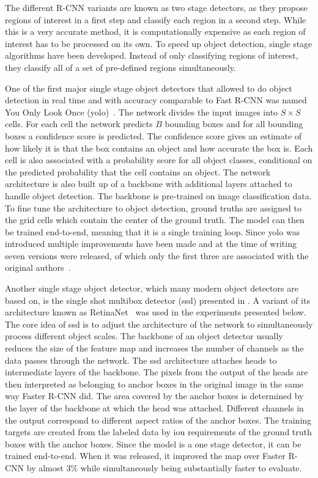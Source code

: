 The different R-CNN variants are known as two stage detectors, as they propose regions of interest in a first step and classify each region in a second step. While this is a very accurate method, it is computationally expensive as each region of interest has to be processed on its own. To speed up object detection, single stage algorithms have been developed. Instead of only classifying regions of interest, they classify all of a set of pre-defined regions simultaneously.

One of the first major single stage object detectors that allowed to do object detection in real time and with accuracy comparable to Fast R-CNN was named You Only Look Once (\acrshort{yolo})~\cite{Redmon:2015aaa}. The network divides the input images into $S\times S$ cells. For each cell the network predicts $B$ bounding boxes and for all bounding boxes a confidence score is predicted. The confidence score gives an estimate of how likely it is that the box contains an object and how accurate the box is. Each cell is also associated with a probability score for all object classes, conditional on the predicted probability that the cell contains an object. The network architecture is also built up of a backbone with additional layers attached to handle object detection. The backbone is pre-trained on image classification data. To fine tune the architecture to object detection, ground truths are assigned to the grid cells which contain the center of the ground truth. The model can then be trained end-to-end, meaning that it is a single training loop. Since \acrshort{yolo} was introduced multiple improvements have been made and at the time of writing seven versions were released, of which only the first three are associated with the original authors~\cite{Redmon:2016aaa, Redmon:2018aaa, Bochkovskiy:2020aaa, Jocher:2022aaa, Li:2022aaa, Wang:2022aaa}.

Another single stage object detector, which many modern object detectors are based on, is the single shot multibox detector (\acrshort{ssd}) presented in \cite{Liu:2016aaa}. A variant of its architecture known as RetinaNet~\cite{Lin:2017aaa} was used in the experiments presented below. The core idea of \acrshort{ssd} is to adjust the architecture of the network to simultaneously process different object scales. The backbone of an object detector usually reduces the size of the feature map and increases the number of channels as the data passes through the network. The \acrshort{ssd} architecture attaches heads to intermediate layers of the backbone. The pixels from the output of the heads are then interpreted as belonging to anchor boxes in the original image in the same way Faster R-CNN did. The area covered by the anchor boxes is determined by the layer of the backbone at which the head was attached. Different channels in the output correspond to different aspect ratios of the anchor boxes. The training targets are created from the labeled data by \acrshort{iou} requirements of the ground truth boxes with the anchor boxes. Since the model is a one stage detector, it can be trained end-to-end. When it was released, it improved the \acrshort{map} over Faster R-CNN by almost $3\%$ while simultaneously being substantially faster to evaluate.

